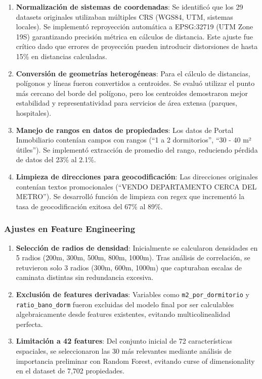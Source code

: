\begin{enumerate}
    \item \textbf{Normalización de sistemas de coordenadas}: Se identificó que los 29 datasets originales utilizaban múltiples CRS (WGS84, UTM, sistemas locales). Se implementó reproyección automática a EPSG:32719 (UTM Zone 19S) garantizando precisión métrica en cálculos de distancia. Este ajuste fue crítico dado que errores de proyección pueden introducir distorsiones de hasta 15\% en distancias calculadas.
    
    \item \textbf{Conversión de geometrías heterogéneas}: Para el cálculo de distancias, polígonos y líneas fueron convertidos a centroides. Se evaluó utilizar el punto más cercano del borde del polígono, pero los centroides demostraron mejor estabilidad y representatividad para servicios de área extensa (parques, hospitales).
    
    \item \textbf{Manejo de rangos en datos de propiedades}: Los datos de Portal Inmobiliario contenían campos con rangos (``1 a 2 dormitorios'', ``30 - 40 m² útiles''). Se implementó extracción de promedio del rango, reduciendo pérdida de datos del 23\% al 2.1\%.
    
    \item \textbf{Limpieza de direcciones para geocodificación}: Las direcciones originales contenían textos promocionales (``VENDO DEPARTAMENTO CERCA DEL METRO''). Se desarrolló función de limpieza con regex que incrementó la tasa de geocodificación exitosa del 67\% al 89\%.
\end{enumerate}

\subsubsection{Ajustes en Feature Engineering}

\begin{enumerate}
    \item \textbf{Selección de radios de densidad}: Inicialmente se calcularon densidades en 5 radios (200m, 300m, 500m, 800m, 1000m). Tras análisis de correlación, se retuvieron solo 3 radios (300m, 600m, 1000m) que capturaban escalas de caminata distintas sin redundancia excesiva.
    
    \item \textbf{Exclusión de features derivadas}: Variables como \texttt{m2\_por\_dormitorio} y \texttt{ratio\_bano\_dorm} fueron excluidas del modelo final por ser calculables algebraicamente desde features existentes, evitando multicolinealidad perfecta.
    
    \item \textbf{Limitación a 42 features}: Del conjunto inicial de 72 características espaciales, se seleccionaron las 30 más relevantes mediante análisis de importancia preliminar con Random Forest, evitando curse of dimensionality en el dataset de 7,702 propiedades.
\end{enumerate}

